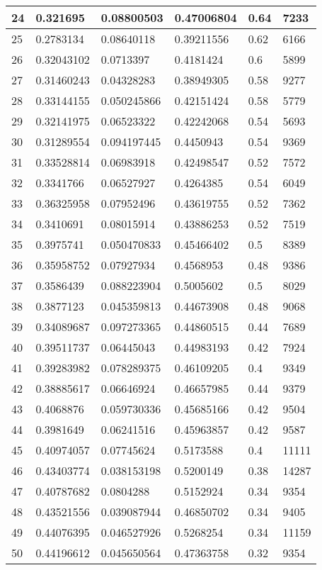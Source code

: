 \begin{longtable}{|l|l|l|l|l|l|}
24 & 0.321695 & 0.08800503 & 0.47006804 & 0.64 & 7233 \\ \hline 
25 & 0.2783134 & 0.08640118 & 0.39211556 & 0.62 & 6166 \\ \hline 
26 & 0.32043102 & 0.0713397 & 0.4181424 & 0.6 & 5899 \\ \hline 
27 & 0.31460243 & 0.04328283 & 0.38949305 & 0.58 & 9277 \\ \hline 
28 & 0.33144155 & 0.050245866 & 0.42151424 & 0.58 & 5779 \\ \hline 
29 & 0.32141975 & 0.06523322 & 0.42242068 & 0.54 & 5693 \\ \hline 
30 & 0.31289554 & 0.094197445 & 0.4450943 & 0.54 & 9369 \\ \hline 
31 & 0.33528814 & 0.06983918 & 0.42498547 & 0.52 & 7572 \\ \hline 
32 & 0.3341766 & 0.06527927 & 0.4264385 & 0.54 & 6049 \\ \hline 
33 & 0.36325958 & 0.07952496 & 0.43619755 & 0.52 & 7362 \\ \hline 
34 & 0.3410691 & 0.08015914 & 0.43886253 & 0.52 & 7519 \\ \hline 
35 & 0.3975741 & 0.050470833 & 0.45466402 & 0.5 & 8389 \\ \hline 
36 & 0.35958752 & 0.07927934 & 0.4568953 & 0.48 & 9386 \\ \hline 
37 & 0.3586439 & 0.088223904 & 0.5005602 & 0.5 & 8029 \\ \hline 
38 & 0.3877123 & 0.045359813 & 0.44673908 & 0.48 & 9068 \\ \hline 
39 & 0.34089687 & 0.097273365 & 0.44860515 & 0.44 & 7689 \\ \hline 
40 & 0.39511737 & 0.06445043 & 0.44983193 & 0.42 & 7924 \\ \hline 
41 & 0.39283982 & 0.078289375 & 0.46109205 & 0.4 & 9349 \\ \hline 
42 & 0.38885617 & 0.06646924 & 0.46657985 & 0.44 & 9379 \\ \hline 
43 & 0.4068876 & 0.059730336 & 0.45685166 & 0.42 & 9504 \\ \hline 
44 & 0.3981649 & 0.06241516 & 0.45963857 & 0.42 & 9587 \\ \hline 
45 & 0.40974057 & 0.07745624 & 0.5173588 & 0.4 & 11111 \\ \hline 
46 & 0.43403774 & 0.038153198 & 0.5200149 & 0.38 & 14287 \\ \hline 
47 & 0.40787682 & 0.0804288 & 0.5152924 & 0.34 & 9354 \\ \hline 
48 & 0.43521556 & 0.039087944 & 0.46850702 & 0.34 & 9405 \\ \hline 
49 & 0.44076395 & 0.046527926 & 0.5268254 & 0.34 & 11159 \\ \hline 
50 & 0.44196612 & 0.045650564 & 0.47363758 & 0.32 & 9354 \\ \hline 
\end{longtable}